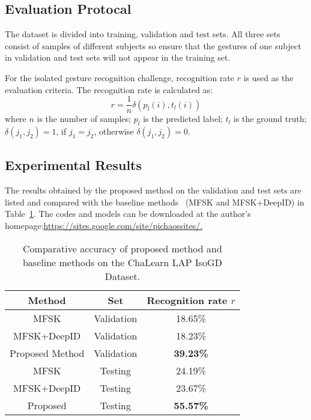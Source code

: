 \documentclass[10pt, a4paper, conference]{IEEEtran}
\begin{document}
\subsection{Evaluation Protocal}

The dataset is divided into training, validation and test sets. All three sets consist of samples of different subjects so ensure that the gestures of one subject in validation and test sets will not appear in the training set.

For the isolated gesture recognition challenge, recognition rate $r$ is used as the evaluation criteria. The recognition rate is calculated as:
\begin{equation}
r = \dfrac{1}{n}\delta(p_{l}(i),t_{l}(i))
\end{equation}
where $n$ is the number of samples; $p_{l}$ is the predicted label; $t_{l}$ is the ground truth; $\delta(j_{1},j_{2}) = 1$, if $j_{1} = j_{2}$, otherwise $\delta(j_{1},j_{2}) = 0$.


\subsection{Experimental Results}

The results obtained by the proposed method on the validation and test sets are listed and compared with the baseline methods~\cite{pami16Jun} (MFSK and MFSK+DeepID) in Table~\ref{table2}. The codes and models can be downloaded at the author's homepage:\url{https://sites.google.com/site/pichaossites/}\href{https://sites.google.com/site/pichaossites/}.

\begin{table}[!ht]
\centering
\caption{Comparative accuracy of proposed method and baseline
methods on the ChaLearn LAP IsoGD Dataset. \label{table2}}
\begin{tabular}{|c|c|c|}
\hline
Method & Set & Recognition rate $r$\\
\hline
MFSK & Validation & 18.65\%\\
\hline
MFSK+DeepID & Validation & 18.23\%\\
\hline
Proposed Method & Validation & \textbf{39.23\%}\\
\hline
MFSK & Testing & 24.19\% \\
\hline
MFSK+DeepID & Testing & 23.67\%\\
\hline
Proposed & Testing &\textbf{55.57\%}\\
\hline
\end{tabular}
\end{table}
\end{document}
